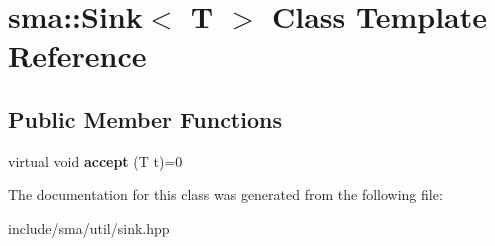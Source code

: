 \hypertarget{classsma_1_1Sink}{\section{sma\-:\-:Sink$<$ T $>$ Class Template Reference}
\label{classsma_1_1Sink}
}
\subsection*{Public Member Functions}
\begin{DoxyCompactItemize}
\item 
\hypertarget{classsma_1_1Sink_ae9d3bc5c9f1935169f5240cbb5bf08f3}{virtual void {\bfseries accept} (T t)=0}\label{classsma_1_1Sink_ae9d3bc5c9f1935169f5240cbb5bf08f3}

\end{DoxyCompactItemize}


The documentation for this class was generated from the following file\-:\begin{DoxyCompactItemize}
\item 
include/sma/util/sink.\-hpp\end{DoxyCompactItemize}
